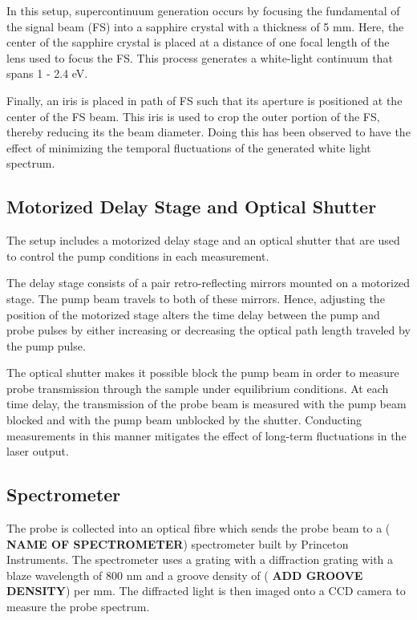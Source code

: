 In this setup, supercontinuum generation occurs by focusing the fundamental of the signal beam (FS) into a sapphire crystal with a thickness of 5 mm. Here, the center of the sapphire crystal is placed at a distance of one focal length of the lens used to focus the FS. This process generates a white-light continuum that spans 1 - 2.4 eV. 

Finally, an iris is placed in path of FS such that its aperture is positioned at the center of the FS beam. This iris is used to crop the outer portion of the FS, thereby reducing its the beam diameter. Doing this has been observed to have the effect of minimizing the temporal fluctuations of the generated white light spectrum. 

\subsection{Motorized Delay Stage and Optical Shutter}

The setup includes a motorized delay stage and an optical shutter that are used to control the pump conditions in each measurement.

The delay stage consists of a pair retro-reflecting mirrors mounted on a motorized stage. The pump beam travels to both of these mirrors. Hence, adjusting the position of the motorized stage alters the time delay between the pump and probe pulses by either increasing or decreasing the optical path length traveled by the pump pulse. 

The optical shutter makes it possible block the pump beam in order to measure probe transmission through the sample under equilibrium conditions. At each time delay, the transmission of the probe beam is measured with the pump beam blocked and with the pump beam unblocked by the shutter. Conducting measurements in this manner mitigates the effect of long-term fluctuations in the laser output. 

\subsection{Spectrometer}
The probe is collected into an optical fibre which sends the probe beam to a (\textbf{\color{red} NAME OF SPECTROMETER}) spectrometer built by Princeton Instruments.  The spectrometer uses a grating with a diffraction grating with a blaze wavelength of 800 nm and a groove density of (\textbf{\color{red} ADD GROOVE DENSITY}) per mm. The diffracted light is then imaged onto a CCD camera to measure the probe spectrum. 

